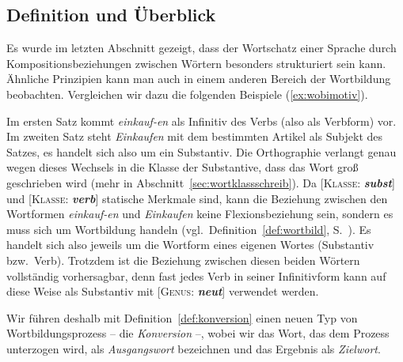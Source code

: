 \label{sec:konv}

\subsection{Definition und Überblick}

\label{sec:konvdef}

Es wurde im letzten Abschnitt gezeigt, dass der Wortschatz einer Sprache durch Kompositionsbeziehungen zwischen Wörtern besonders strukturiert sein kann.
Ähnliche Prinzipien kann man auch in einem anderen Bereich der Wortbildung beobachten.
Vergleichen wir dazu die folgenden Beispiele (\ref{ex:wobimotiv}).

\begin{exe}
  \ex\label{ex:wobimotiv}
  \begin{xlist}
  \end{xlist}
\end{exe}

Im ersten Satz kommt \textit{einkauf-en} als Infinitiv des Verbs (also als Verbform) vor.
Im zweiten Satz steht \textit{Einkaufen} mit dem bestimmten Artikel als Subjekt des Satzes, es handelt sich also um ein Substantiv.
Die Orthographie verlangt genau wegen dieses Wechsels in die Klasse der Substantive, dass das Wort groß geschrieben wird (mehr in Abschnitt~\ref{sec:wortklassschreib}).
Da [\textsc{Klasse}: \textit{\textbf{subst}}] und [\textsc{Klasse}: \textit{\textbf{verb}}] statische Merkmale sind, kann die Beziehung zwischen den Wortformen \textit{einkauf-en} und \textit{Einkaufen} keine Flexionsbeziehung sein, sondern es muss sich um Wortbildung handeln (vgl.\ Definition~\ref{def:wortbild}, S.~\pageref{def:wortbild}).
Es handelt sich also jeweils um die Wortform eines eigenen Wortes (Substantiv bzw.\ Verb).
Trotzdem ist die Beziehung zwischen diesen beiden Wörtern vollständig vorhersagbar, denn fast jedes Verb in seiner Infinitivform kann auf diese Weise als Substantiv mit [\textsc{Genus}: \textit{\textbf{neut}}] verwendet werden.

Wir führen deshalb mit Definition~\ref{def:konversion} einen neuen Typ von Wortbildungsprozess -- die \textit{Konversion} --, wobei wir das Wort, das dem Prozess unterzogen wird, als \textit{Ausgangswort} bezeichnen und das Ergebnis als \textit{Zielwort}.


